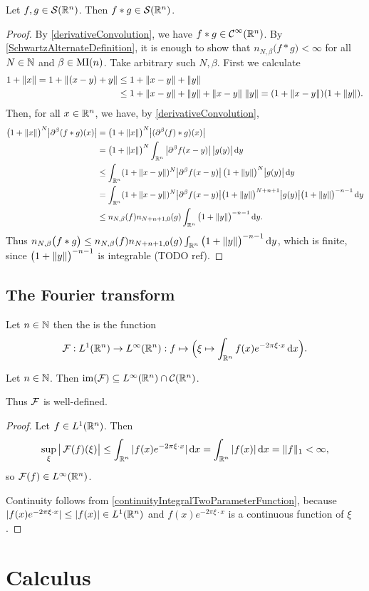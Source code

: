 \begin{proposition}
Let $f,g\in \operatorname{\mathcal{S}}(\mathbb{R}^n)$. Then $f*g \in \operatorname{\mathcal{S}}(\mathbb{R}^n)$.
\end{proposition}
\begin{proof}
By \ref{derivativeConvolution}, we have $f*g\in \operatorname{\mathcal{C}}^\infty(\mathbb{R}^n)$. By \ref{SchwartzAlternateDefinition}, it is enough to show that $n_{N,\beta}\big(f*g\big) < \infty$ for all $N\in\mathbb{N}$ and $\beta\in\operatorname{MI}(n)$. Take arbitrary such $N,\beta$. First we calculate
\begin{align*}
1+\lVert x\rVert = 1+\lVert(x-y)+y\rVert &\leq 1+\lVert x-y\rVert + \lVert y\rVert \\
&\leq 1+\lVert x-y\rVert + \lVert y\rVert + \lVert x-y\rVert\;\lVert y\rVert = (1+\lVert x-y\rVert)(1+\lVert y\rVert).
\end{align*}
Then, for all $x\in \mathbb{R}^n$, we have, by \ref{derivativeConvolution},
\begin{align*}
\big(1+\lVert x\rVert\big)^N\big|\partial^\beta(f*g)(x)\big| &= \big(1+\lVert x\rVert\big)^N\big|(\partial^\beta(f)*g)(x)\big| \\
&= \big(1+\lVert x\rVert\big)^N\int_{\mathbb{R}^n}\big|\partial^\beta f(x-y)\big|\, \big|g(y)\big|\operatorname{d \!}{y} \\
&\leq \int_{\mathbb{R}^n}(1+\lVert x-y\rVert)^N\big|\partial^\beta f(x-y)\big|\, \big(1+\lVert y\rVert\big)^N\big|g(y)\big|\operatorname{d \!}{y} \\
&= \int_{\mathbb{R}^n}(1+\lVert x-y\rVert)^N\big|\partial^\beta f(x-y)\big|\big(1+\lVert y\rVert\big)^{N+n+1}\big|g(y)\big|\big(1+\lVert y\rVert\big)^{-n-1}\operatorname{d \!}{y} \\
&\leq n_{N,\beta}(f)n_{N+n+1, 0}(g)\int_{\mathbb{R}^n}\big(1+\lVert y\rVert\big)^{-n-1}\operatorname{d \!}{y}.
\end{align*}
Thus $n_{N,\beta}\big(f*g\big) \leq n_{N,\beta}(f)n_{N+n+1, 0}(g)\int_{\mathbb{R}^n}\big(1+\lVert y\rVert\big)^{-n-1}\operatorname{d \!}{y}$, which is finite, since $\big(1+\lVert y\rVert\big)^{-n-1}$ is integrable (TODO ref).
\end{proof}

\section{The Fourier transform}
\begin{definition}
Let $n\in \mathbb{N}$ then the  is the function
\[ \operatorname{\mathcal{F}}: L^1(\mathbb{R}^n) \to L^\infty(\mathbb{R}^n): f\mapsto \Big( \xi \mapsto \int_{\mathbb{R}^n}f(x)e^{-2\pi \xi\cdot x}\operatorname{d \!}{x} \Big). \]
\end{definition}

\begin{lemma}
Let $n\in \mathbb{N}$. Then $\operatorname{im}(\operatorname{\mathcal{F}}) \subseteq L^\infty(\mathbb{R}^n)\cap \operatorname{\mathcal{C}}(\mathbb{R}^n)$.
\end{lemma}
Thus $\operatorname{\mathcal{F}}$ is well-defined.
\begin{proof}
Let $f\in L^1(\mathbb{R}^n)$. Then
\[ \sup_{\xi}\big|\operatorname{\mathcal{F}}(f)(\xi)\big| \leq \int_{\mathbb{R}^n}|f(x)e^{-2\pi \xi\cdot x}|\operatorname{d \!}{x} = \int_{\mathbb{R}^n}|f(x)|\operatorname{d \!}{x} = \lVert f\rVert_1 < \infty, \]
so $\operatorname{\mathcal{F}}(f) \in L^\infty(\mathbb{R}^n)$.

Continuity follows from \ref{continuityIntegralTwoParameterFunction}, because $|f(x)e^{-2\pi \xi\cdot x}| \leq |f(x)|\in L^1(\mathbb{R}^n)$ and $f(x)e^{-2\pi \xi\cdot x}$ is a continuous function of $\xi$.
\end{proof}


\chapter{Calculus}


